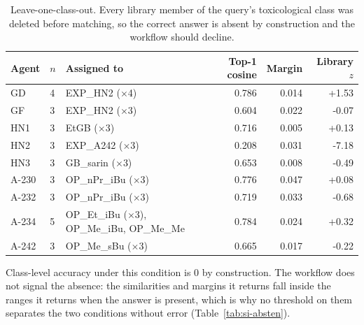 \begin{table}[htbp]
\centering
\caption{Leave-one-class-out. Every library member of the query's toxicological class was deleted before matching, so the correct answer is absent by construction and the workflow should decline.}
\label{tab:si-loco}
\small
\begin{tabular}{llp{4.4cm}rrr}
\toprule
Agent & $n$ & Assigned to & Top-1 cosine & Margin & Library $z$ \\
\midrule
GD & 4 & EXP\_HN2 ($\times$4) & 0.786 & 0.014 & +1.53 \\
GF & 3 & EXP\_HN2 ($\times$3) & 0.604 & 0.022 & -0.07 \\
HN1 & 3 & EtGB ($\times$3) & 0.716 & 0.005 & +0.13 \\
HN2 & 3 & EXP\_A242 ($\times$3) & 0.208 & 0.031 & -7.18 \\
HN3 & 3 & GB\_sarin ($\times$3) & 0.653 & 0.008 & -0.49 \\
A-230 & 3 & OP\_nPr\_iBu ($\times$3) & 0.776 & 0.047 & +0.08 \\
A-232 & 3 & OP\_nPr\_iBu ($\times$3) & 0.719 & 0.033 & -0.68 \\
A-234 & 5 & OP\_Et\_iBu ($\times$3), OP\_Me\_iBu, OP\_Me\_Me & 0.784 & 0.024 & +0.32 \\
A-242 & 3 & OP\_Me\_sBu ($\times$3) & 0.665 & 0.017 & -0.22 \\
\bottomrule
\end{tabular}

\begin{flushleft}\footnotesize Class-level accuracy under this condition is 0 by construction. The workflow does not signal the absence: the similarities and margins it returns fall inside the ranges it returns when the answer is present, which is why no threshold on them separates the two conditions without error (Table~\ref{tab:si-absten}).\end{flushleft}
\end{table}
